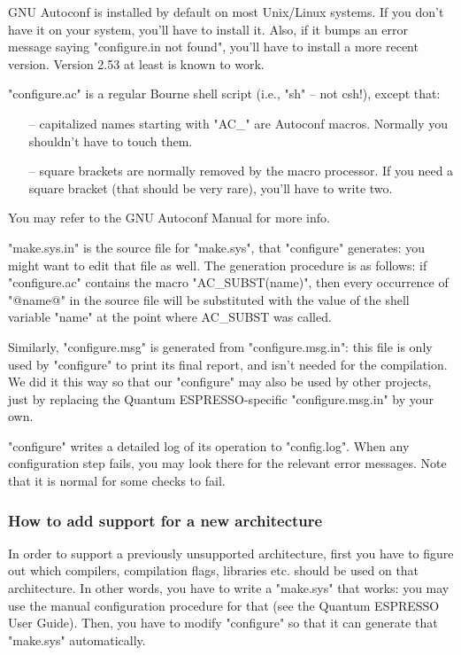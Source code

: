 \documentclass[12pt,a4paper]{article}
\begin{document}
GNU Autoconf is installed by default on most Unix/Linux systems.  If
you don't have it on your system, you'll have to install it.  Also, if
it bumps an error message saying "configure.in not found", you'll have
to install a more recent version.  Version 2.53 at least is known to
work.

"configure.ac" is a regular Bourne shell script (i.e., "sh" -- not csh!), 
except that:
\begin{itemize}
\item[--] capitalized names starting with "AC\_" are Autoconf macros.  Normally you shouldn't have to touch them.
\item[--] square brackets are normally removed by the macro processor.  If you need a square bracket (that should be very rare), you'll have to write two.
\end{itemize}

You may refer to the GNU Autoconf Manual for more info.

"make.sys.in" is the source file for "make.sys", that "configure"
generates: you might want to edit that file as well.  The generation
procedure is as follows: if "configure.ac" contains the macro
"AC\_SUBST(name)", then every occurrence of "@name@" in the source
file will be substituted with the value of the shell variable "name"
at the point where AC\_SUBST was called.

Similarly, "configure.msg" is generated from "configure.msg.in": this
file is only used by "configure" to print its final report, and isn't
needed for the compilation.  We did it this way so that our
"configure" may also be used by other projects, just by replacing the
Quantum ESPRESSO-specific "configure.msg.in" by your own.

"configure" writes a detailed log of its operation to "config.log".
When any configuration step fails, you may look there for the relevant
error messages.  Note that it is normal for some checks to fail.

\subsubsection{How to add support for a new architecture}

In order to support a previously unsupported architecture, first you
have to figure out which compilers, compilation flags, libraries
etc. should be used on that architecture.
In other words, you have to write a "make.sys" that works: you may use
the manual configuration procedure for that (see the Quantum ESPRESSO
User Guide).  Then, you have to modify "configure" so that it can
generate that "make.sys" automatically.
\end{document}

